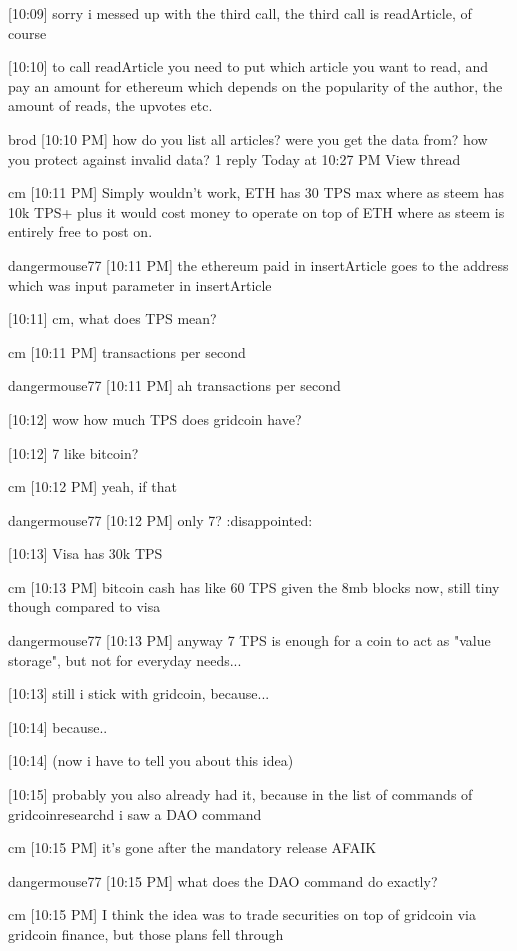 {[10:09] 
sorry i messed up with the third call, the third call is readArticle, of course


[10:10] 
to call readArticle you need to put which article you want to read, and pay an amount for ethereum which depends on the popularity of the author, the amount of reads, the upvotes etc.


brod 
[10:10 PM] 
how do you list all articles? were you get the data from? how you protect against invalid data?
1 reply Today at 10:27 PM View thread


cm 
[10:11 PM] 
Simply wouldn't work, ETH has 30 TPS max where as steem has 10k TPS+ plus it would cost money to operate on top of ETH where as steem is entirely free to post on.


dangermouse77 [10:11 PM] 
the ethereum paid in insertArticle goes to the address which was input parameter in insertArticle


[10:11] 
cm, what does TPS mean?


cm 
[10:11 PM] 
transactions per second


dangermouse77 [10:11 PM] 
ah transactions per second


[10:12] 
wow how much TPS does gridcoin have?


[10:12] 
7 like bitcoin?


cm 
[10:12 PM] 
yeah, if that


dangermouse77 [10:12 PM] 
only 7? :disappointed:


[10:13] 
Visa has 30k TPS


cm 
[10:13 PM] 
bitcoin cash has like 60 TPS given the 8mb blocks now, still tiny though compared to visa


dangermouse77 [10:13 PM] 
anyway 7 TPS is enough for a coin to act as "value storage", but not for everyday needs...


[10:13] 
still i stick with gridcoin, because...


[10:14] 
because..


[10:14] 
(now i have to tell you about this idea)


[10:15] 
probably you also already had it, because in the list of commands of gridcoinresearchd i saw a DAO command


cm 
[10:15 PM] 
it's gone after the mandatory release AFAIK


dangermouse77 [10:15 PM] 
what does the DAO command do exactly?


cm 
[10:15 PM] 
I think the idea was to trade securities on top of gridcoin via gridcoin finance, but those plans fell through


}
